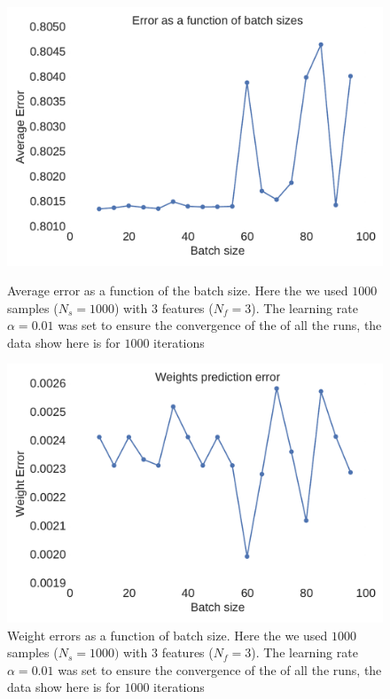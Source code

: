 \documentclass[11pt,a4paper]{article}
\begin{document}
\begin{figure}[H]
	\centering
  \includegraphics[width=\linewidth]{errors_batch_scaling.pdf}
  \caption{Average error as a function of the batch size. Here the we used $1000$ samples ($N_s=1000$) with $3$ features ($N_f=3$). The learning rate $\alpha=0.01$ was set to ensure the convergence of the of all the runs, the data show here is for $1000$ iterations}
  \label{fig:test_batch_size_error}
\endminipage
\hfill
{}
  \includegraphics[width=\linewidth]{weights_errors_batch_scaling.pdf}
  \caption{Weight errors as a function of batch size. Here the we used $1000$ samples ($N_s=1000) $ with $3$ features ($N_f=3$). The learning rate $\alpha=0.01$ was set to ensure the convergence of the of all the runs, the data show here is for $1000$ iterations}
  \label{fig:test_batch_size_werror}
\endminipage
\end{figure}
\end{document}
